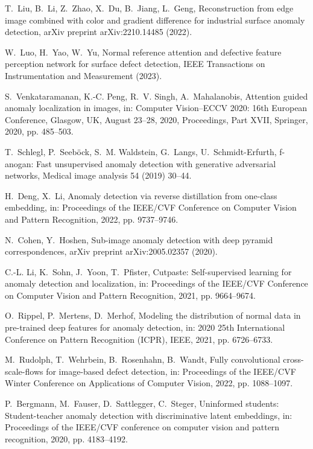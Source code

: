 \documentclass[final,5p,times,twocolumn]{elsarticle}
\begin{document}
\begin{thebibliography}{10}
T.~Liu, B.~Li, Z.~Zhao, X.~Du, B.~Jiang, L.~Geng, Reconstruction from edge
  image combined with color and gradient difference for industrial surface
  anomaly detection, arXiv preprint arXiv:2210.14485 (2022).

W.~Luo, H.~Yao, W.~Yu, Normal reference attention and defective feature
  perception network for surface defect detection, IEEE Transactions on
  Instrumentation and Measurement (2023).

S.~Venkataramanan, K.-C. Peng, R.~V. Singh, A.~Mahalanobis, Attention guided
  anomaly localization in images, in: Computer Vision--ECCV 2020: 16th European
  Conference, Glasgow, UK, August 23--28, 2020, Proceedings, Part XVII,
  Springer, 2020, pp. 485--503.

T.~Schlegl, P.~Seeb{\"o}ck, S.~M. Waldstein, G.~Langs, U.~Schmidt-Erfurth,
  f-anogan: Fast unsupervised anomaly detection with generative adversarial
  networks, Medical image analysis 54 (2019) 30--44.

H.~Deng, X.~Li, Anomaly detection via reverse distillation from one-class
  embedding, in: Proceedings of the IEEE/CVF Conference on Computer Vision and
  Pattern Recognition, 2022, pp. 9737--9746.

N.~Cohen, Y.~Hoshen, Sub-image anomaly detection with deep pyramid
  correspondences, arXiv preprint arXiv:2005.02357 (2020).

C.-L. Li, K.~Sohn, J.~Yoon, T.~Pfister, Cutpaste: Self-supervised learning for
  anomaly detection and localization, in: Proceedings of the IEEE/CVF
  Conference on Computer Vision and Pattern Recognition, 2021, pp. 9664--9674.

O.~Rippel, P.~Mertens, D.~Merhof, Modeling the distribution of normal data in
  pre-trained deep features for anomaly detection, in: 2020 25th International
  Conference on Pattern Recognition (ICPR), IEEE, 2021, pp. 6726--6733.

M.~Rudolph, T.~Wehrbein, B.~Rosenhahn, B.~Wandt, Fully convolutional
  cross-scale-flows for image-based defect detection, in: Proceedings of the
  IEEE/CVF Winter Conference on Applications of Computer Vision, 2022, pp.
  1088--1097.

P.~Bergmann, M.~Fauser, D.~Sattlegger, C.~Steger, Uninformed students:
  Student-teacher anomaly detection with discriminative latent embeddings, in:
  Proceedings of the IEEE/CVF conference on computer vision and pattern
  recognition, 2020, pp. 4183--4192.


\end{thebibliography}
\end{document}
